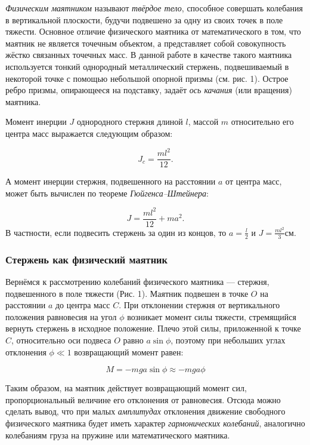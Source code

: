 \documentclass[12pt, a4paper]{article}
\begin{document}
\textit{Физическим маятником} называют \textit{твёрдое тело}, способное
совершать колебания в вертикальной плоскости, будучи подвешено за одну из
своих точек в поле тяжести. Основное отличие физического маятника от
математического в том, что маятник не является точечным объектом, а
представляет собой совокупность жёстко связанных точечных масс. В данной
работе в качестве такого маятника используется тонкий однородный металлический
стержень, подвешиваемый в некоторой точке с помощью небольшой опорной призмы
(см. рис. 1). Острое ребро призмы, опирающееся на подставку, задаёт 
\textit{ось качания} (или вращения) маятника.

Момент инерции $J$ однородного стержня длиной $l$, массой $m$ относительно
его центра масс выражается следующим образом:

\[J_c = \frac{ml^2}{12}.\]

А момент инерции стержня, подвешенного на расстоянии $a$ от центра масс,
может быть вычислен по теореме \textit{Гюйгенса–Штейнера}:

\begin{equation}
    J = \frac{ml^2}{12} + ma^2.
\end{equation}
В частности, если подвесить стержень за один из концов, то
$a = \frac{l}{2}$ и $J = \frac{ml^2}{3} \text{см}$.

\subsubsection*{Стержень как физический маятник}

Вернёмся к рассмотрению колебаний физического маятника —
стержня, подвешенного в поле тяжести (Рис. 1). Маятник подвешен в
точке $O$ на расстоянии $a$ до центра масс $C$. При отклонении стержня от
вертикального положения равновесия на угол $\phi$ возникает момент силы
тяжести, стремящийся вернуть стержень в исходное положение. Плечо этой
силы, приложенной к точке $C$, относительно оси подвеса $O$ равно
$a\sin{\phi}$, поэтому при небольших углах отклонения $\phi \ll 1 $
возвращающий момент равен:

\[M = -mga\sin{\phi} \approx -mga\phi\]

Таким образом, на маятник действует возвращающий момент
\newline
сил, пропорциональный
величине его отклонения от равновесия. Отсюда можно сделать вывод, что при
малых \textit{амплитудах} отклонения движение свободного физического маятника
будет иметь характер \textit{гармонических колебаний}, аналогично колебаниям
груза на пружине или математического маятника. 
\end{document}
